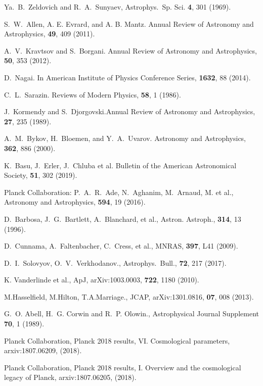 \documentclass[
aps,%
12pt,%
final,%
notitlepage,%
oneside,%
onecolumn,%
nobibnotes,%
nofootinbib,%
superscriptaddress,%
noshowpacs,%
centertags]%
{revtex4}
\begin{document}
\begin{thebibliography}{99}

Ya.~B.~Zeldovich and R.~A.~Sunyaev, Astrophys.~Sp. Sci. {\bf 4}, 301 (1969).

 S.~W.~Allen, A. E. Evrard, and A. B. Mantz. Annual Review of Astronomy and Astrophysics, {\bf 49}, 409 (2011).

 A.~V.~Kravtsov and S.~Borgani. Annual Review of Astronomy and Astrophysics, {\bf 50}, 353 (2012).

 D.~Nagai. In American Institute of Physics
Conference Series, {\bf 1632}, 88 (2014).

 C.~L.~Sarazin. Reviews of Modern Physics, {\bf 58}, 1 (1986).

 J.~Kormendy and S.~Djorgovski.Annual Review of Astronomy and Astrophysics, {\bf 27}, 235 (1989).


 A.~M.~Bykov, H.~Bloemen, and Y.~A.~Uvarov. Astronomy and Astrophysics, {\bf 362}, 886 (2000).

 K.~Basu, J.~Erler, J.~Chluba et al. Bulletin of the American Astronomical Society, {\bf 51}, 302 (2019).

Planck Collaboration: P.~A.~R.~Ade, N.~Aghanim, M.~Arnaud, M. et al., Astronomy and Astrophysics, {\bf 594}, 19 (2016).

D.~Barbosa, J.~G.~Bartlett, A.~Blanchard, et al., Astron. Astroph., {\bf 314}, 13 (1996).

D.~Cunnama, A.~Faltenbacher, C.~Cress, et al., MNRAS, {\bf 397}, L41 (2009).

 D.~I.~Solovyov, O.~V.~Verkhodanov., Astrophys.~Bull., {\bf 72}, 217 (2017).
 
K. Vanderlinde et al., ApJ, arXiv:1003.0003, {\bf 722}, 1180 (2010).

M.Hasselfield, M.Hilton, T.A.Marriage., JCAP, arXiv:1301.0816, {\bf 07}, 008 (2013).

G.~O. Abell, H.~G. Corwin and  R.~P. Olowin., Astrophysical Journal Supplement {\bf 70}, 1 (1989).


Planck Collaboration, Planck 2018 results, VI. Cosmological parameters,
arxiv:1807.06209, (2018). 


Planck Collaboration, Planck 2018 results, I. Overview and the cosmological legacy of
Planck, arxiv:1807.06205, (2018).



\end{thebibliography}
\end{document}
